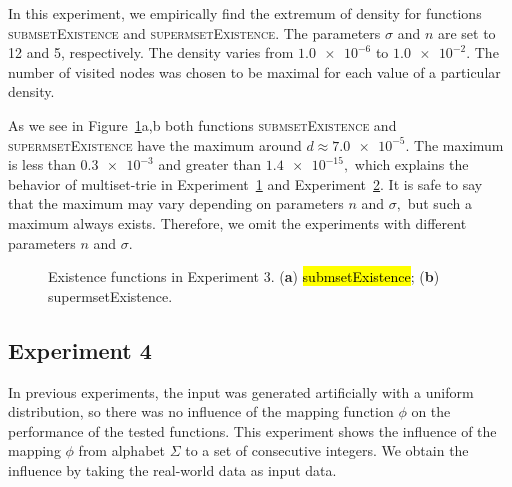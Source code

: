 \documentclass[algorithms,article,accept,pdftex,moreauthors]{Definitions/mdpi}
\begin{document}
In this experiment, we empirically find the extremum of density for functions 
\textsc{submsetExistence} and \textsc{supermsetExistence}. The parameters 
$\sigma$ and $n$ are set to 12 and 5, respectively. The density varies from 
$\num{1.0e-6}$ to $\num{1.0e-2}.$ The number of visited nodes was chosen to be 
maximal for each value of a particular density.

As we see in Figure~\ref{fig:e3m1}a,b both functions 
\textsc{submsetExistence} and \textsc{supermsetExistence} have the maximum 
around $d\approx \num{7.0e-5}.$ The maximum is less than $\num{0.3e-3}$ and 
greater than $\num{1.4e-15},$ which explains the behavior of multiset-trie in 
Experiment~\hyperref[s:exp1]{1} and Experiment~\hyperref[s:exp2]{2}. It is safe 
to say that the maximum may vary depending on parameters $n$ and $\sigma,$ but 
such a maximum always exists. Therefore, we omit the experiments with different 
parameters $n$ and $\sigma.$

\begin{figure}[H]

\caption{Existence functions in Experiment 3. (\textbf{a}) \hl{submsetExistence}; (\textbf{b}) supermsetExistence.\label{fig:e3m1}}
\end{figure}


\subsection{Experiment 4} \label{s:exp4}
In previous experiments, the input was generated artificially with a uniform 
distribution, so there was no influence of the mapping function $\phi$ on 
the performance of the tested functions. This experiment shows the influence of the 
mapping $\phi$ from alphabet $\Sigma$ to a set of consecutive integers. 
We obtain the influence by taking the real-world data as input data. 
\end{document}
